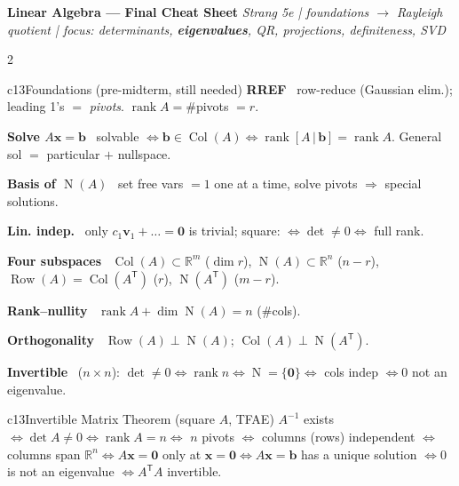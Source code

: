 \documentclass[10pt]{extarticle}
\newcommand{\h}[1]{{\bfseries #1}\ }
\newcommand{\R}{\mathbb{R}}
\newcommand{\T}{^{\mathsf T}}
\newcommand{\rank}{\operatorname{rank}}
\newcommand{\Col}{\operatorname{Col}}
\newcommand{\Row}{\operatorname{Row}}
\newcommand{\Nul}{\operatorname{N}}
\newcommand{\dimm}{\operatorname{dim}}
\newcommand{\bv}{\mathbf{v}}
\newcommand{\bx}{\mathbf{x}}
\newcommand{\bb}{\mathbf{b}}
\begin{document}
\begin{center}\vspace{-3mm}
{\large\bfseries Linear Algebra --- Final Cheat Sheet}\quad
{\scriptsize \textit{Strang 5e \;|\; foundations $\to$ Rayleigh quotient \;|\; focus: determinants, \textbf{eigenvalues}, QR, projections, definiteness, SVD}}
\end{center}
\vspace{-1mm}

\begin{multicols}{2}

\begin{tbox}{c13}{Foundations (pre-midterm, still needed)}
\h{RREF} row-reduce (Gaussian elim.); leading 1's $=$ \emph{pivots}. $\rank A=\#$pivots $=r$.\par
\h{Solve $A\bx=\bb$} solvable $\iff \bb\in\Col(A)\iff\rank[A\,|\,\bb]=\rank A$. General sol $=$ particular $+$ nullspace.\par
\h{Basis of $\Nul(A)$} set free vars $=1$ one at a time, solve pivots $\Rightarrow$ special solutions.\par
\h{Lin. indep.} only $c_1\bv_1{+}\dots{=}\mathbf0$ is trivial; square: $\iff\det\neq0\iff$ full rank.\par
\h{Four subspaces} $\Col(A)\subset\R^m$ ($\dimm r$), $\Nul(A)\subset\R^n$ ($n{-}r$), $\Row(A){=}\Col(A\T)$ ($r$), $\Nul(A\T)$ ($m{-}r$).\par
\h{Rank--nullity} $\rank A+\dimm\Nul(A)=n$ (\#cols).\par
\h{Orthogonality} $\Row(A)\perp\Nul(A)$; $\Col(A)\perp\Nul(A\T)$.\par
\h{Invertible} ($n{\times}n$): $\det\neq0\iff\rank n\iff\Nul{=}\{\mathbf0\}\iff$ cols indep $\iff0$ not an eigenvalue.
\end{tbox}

\begin{tbox}{c13}{Invertible Matrix Theorem (square $A$, TFAE)}
$A^{-1}$ exists $\iff\det A\neq0\iff\rank A=n\iff$ $n$ pivots $\iff$ columns (rows) independent $\iff$ columns span $\R^n\iff A\bx=\mathbf0$ only at $\bx=\mathbf0\iff A\bx=\bb$ has a unique solution $\iff0$ is not an eigenvalue $\iff A\T A$ invertible.
\end{tbox}


\end{multicols}
\end{document}
